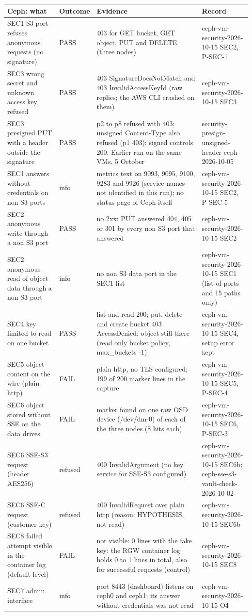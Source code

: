 \begin{tabular}{@{}p{3.6cm}lp{7.4cm}p{3.6cm}@{}}
\toprule
Ceph: what & Outcome & Evidence & Record \\
\midrule
SEC1 S3 port refuses anonymous requests (no signature) & PASS & 403 for GET bucket, GET object, PUT and DELETE (three nodes) & ceph-vm-security-2026-10-15 SEC2, P-SEC-1 \\
SEC3 wrong secret and unknown access key refused & PASS & 403 SignatureDoesNotMatch and 403 InvalidAccessKeyId (raw replies; the AWS CLI crashed on them) & ceph-vm-security-2026-10-15 SEC3 \\
SEC3 presigned PUT with a header outside the signature & PASS & p2 to p8 refused with 403; unsigned Content-Type also refused (p1 403); signed controls 200. Earlier run on the same VMs, 5 October & security-presign-unsigned-header-ceph-2026-10-05 \\
SEC1 answers without credentials on non S3 ports & info & metrics text on 9093, 9095, 9100, 9283 and 9926 (service names not identified in this run); no status page of Ceph itself & ceph-vm-security-2026-10-15 SEC2, P-SEC-5 \\
SEC2 anonymous write through a non S3 port & PASS & no 2xx: PUT answered 404, 405 or 301 by every non S3 port that answered & ceph-vm-security-2026-10-15 SEC2 \\
SEC2 anonymous read of object data through a non S3 port & info & no non S3 data port in the SEC1 list & ceph-vm-security-2026-10-15 SEC1 (list of ports and 15 paths only) \\
SEC4 key limited to read on one bucket & PASS & list and read 200; put, delete and create bucket 403 AccessDenied; object still there (read only bucket policy, max\_buckets -1) & ceph-vm-security-2026-10-15 SEC4, setup error kept \\
SEC5 object content on the wire (plain http) & FAIL & plain http, no TLS configured; 199 of 200 marker lines in the capture & ceph-vm-security-2026-10-15 SEC5, P-SEC-4 \\
SEC6 object stored without SSE on the data drives & FAIL & marker found on one raw OSD device (/dev/dm-0) of each of the three nodes (8 hits each) & ceph-vm-security-2026-10-15 SEC6, P-SEC-3 \\
SEC6 SSE-S3 request (header AES256) & refused & 400 InvalidArgument (no key service for SSE-S3 configured) & ceph-vm-security-2026-10-15 SEC6b; ceph-sse-s3-vault-check-2026-10-02 \\
SEC6 SSE-C request (customer key) & refused & 400 InvalidRequest over plain http (reason: HYPOTHESIS, not read) & ceph-vm-security-2026-10-15 SEC6b \\
SEC8 failed attempt visible in the container log (default level) & FAIL & not visible: 0 lines with the fake key; the RGW container log holds 0 to 1 lines in total, also for successful requests (control) & ceph-vm-security-2026-10-15 SEC8 \\
SEC7 admin interface & info & port 8443 (dashboard) listens on ceph0 and ceph1; its answer without credentials was not read & ceph-vm-security-2026-10-15 O4 \\
\bottomrule
\end{tabular}
